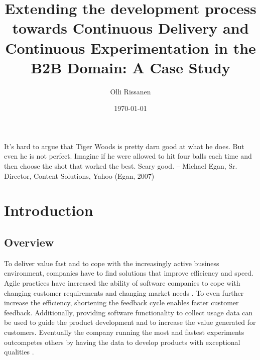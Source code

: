 \documentclass[english]{tktltiki2}
\title{Extending the development process towards Continuous Delivery and Continuous Experimentation in the B2B Domain: A Case Study}
\author{Olli Rissanen}
\date{\today}
\theoremstyle{definition}
\theoremstyle{remark}
\begin{document}

\frontmatter      %

\maketitle        %
\makeabstract     %

\tableofcontents  %

\newpage
\listoffigures
\listoftables

\newpage

It’s hard to argue that Tiger Woods is pretty darn good at what he does. But even he is not perfect. Imagine if
he were allowed to hit four balls each time and then choose the shot that worked the best. Scary good.
-- Michael Egan, Sr. Director, Content Solutions, Yahoo (Egan, 2007)


\mainmatter       %




\section{Introduction} %

\subsection{Overview}
To deliver value fast and to cope with the increasingly active business environment, companies have to find solutions that improve efficiency and speed. Agile practices \cite{cockburn2002agile} have increased the ability of software companies to cope with changing customer requirements and changing market needs \cite{dzamashvili2010impact}. To even further increase the efficiency, shortening the feedback cycle enables faster customer feedback. Additionally, providing software functionality to collect usage data can be used to guide the product development and to increase the value generated for customers. Eventually the company running the most and fastest experiments outcompetes others by having the data to develop products with exceptional qualities \cite{eklund2012architecture}.
\end{document}
